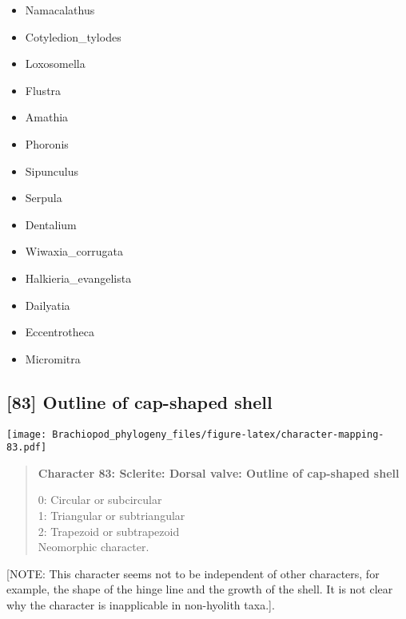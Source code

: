 \documentclass[openany]{book}
\providecommand{\tightlist}{%
  \setlength{\itemsep}{0pt}\setlength{\parskip}{0pt}}
\theoremstyle{definition}
\theoremstyle{definition}
\theoremstyle{definition}
\theoremstyle{remark}
\begin{document}
\begin{itemize}
\tightlist
\item
  Namacalathus\\
\item
  Cotyledion\_tylodes\\
\item
  Loxosomella\\
\item
  Flustra\\
\item
  Amathia\\
\item
  Phoronis\\
\item
  Sipunculus\\
\item
  Serpula\\
\item
  Dentalium\\
\item
  Wiwaxia\_corrugata\\
\item
  Halkieria\_evangelista\\
\item
  Dailyatia\\
\item
  Eccentrotheca\\
\item
  Micromitra
\end{itemize}

\subsection*{{[}83{]} Outline of cap-shaped
shell}\label{outline-of-cap-shaped-shell}

\texttt{[image: Brachiopod\_phylogeny\_files/figure-latex/character-mapping-83.pdf]}

\begin{quote}
\textbf{Character 83: Sclerite: Dorsal valve: Outline of cap-shaped
shell}

0: Circular or subcircular\\
1: Triangular or subtriangular\\
2: Trapezoid or subtrapezoid\\
Neomorphic character.
\end{quote}

{[}NOTE: This character seems not to be independent of other characters,
for example, the shape of the hinge line and the growth of the shell. It
is not clear why the character is inapplicable in non-hyolith taxa.{]}.
\end{document}
